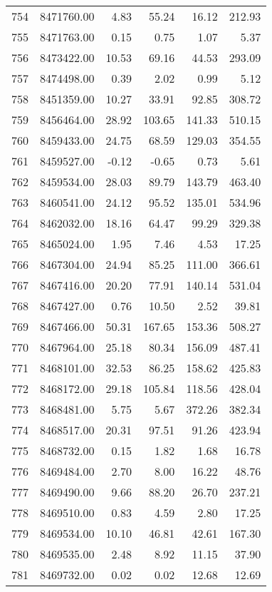 \begin{table}[ht]
\begin{tabular}{rrrrrr}
  754 & 8471760.00 & 4.83 & 55.24 & 16.12 & 212.93 \\ 
  755 & 8471763.00 & 0.15 & 0.75 & 1.07 & 5.37 \\ 
  756 & 8473422.00 & 10.53 & 69.16 & 44.53 & 293.09 \\ 
  757 & 8474498.00 & 0.39 & 2.02 & 0.99 & 5.12 \\ 
  758 & 8451359.00 & 10.27 & 33.91 & 92.85 & 308.72 \\ 
  759 & 8456464.00 & 28.92 & 103.65 & 141.33 & 510.15 \\ 
  760 & 8459433.00 & 24.75 & 68.59 & 129.03 & 354.55 \\ 
  761 & 8459527.00 & -0.12 & -0.65 & 0.73 & 5.61 \\ 
  762 & 8459534.00 & 28.03 & 89.79 & 143.79 & 463.40 \\ 
  763 & 8460541.00 & 24.12 & 95.52 & 135.01 & 534.96 \\ 
  764 & 8462032.00 & 18.16 & 64.47 & 99.29 & 329.38 \\ 
  765 & 8465024.00 & 1.95 & 7.46 & 4.53 & 17.25 \\ 
  766 & 8467304.00 & 24.94 & 85.25 & 111.00 & 366.61 \\ 
  767 & 8467416.00 & 20.20 & 77.91 & 140.14 & 531.04 \\ 
  768 & 8467427.00 & 0.76 & 10.50 & 2.52 & 39.81 \\ 
  769 & 8467466.00 & 50.31 & 167.65 & 153.36 & 508.27 \\ 
  770 & 8467964.00 & 25.18 & 80.34 & 156.09 & 487.41 \\ 
  771 & 8468101.00 & 32.53 & 86.25 & 158.62 & 425.83 \\ 
  772 & 8468172.00 & 29.18 & 105.84 & 118.56 & 428.04 \\ 
  773 & 8468481.00 & 5.75 & 5.67 & 372.26 & 382.34 \\ 
  774 & 8468517.00 & 20.31 & 97.51 & 91.26 & 423.94 \\ 
  775 & 8468732.00 & 0.15 & 1.82 & 1.68 & 16.78 \\ 
  776 & 8469484.00 & 2.70 & 8.00 & 16.22 & 48.76 \\ 
  777 & 8469490.00 & 9.66 & 88.20 & 26.70 & 237.21 \\ 
  778 & 8469510.00 & 0.83 & 4.59 & 2.80 & 17.25 \\ 
  779 & 8469534.00 & 10.10 & 46.81 & 42.61 & 167.30 \\ 
  780 & 8469535.00 & 2.48 & 8.92 & 11.15 & 37.90 \\ 
  781 & 8469732.00 & 0.02 & 0.02 & 12.68 & 12.69 \\ 

\end{tabular}
\end{table}
